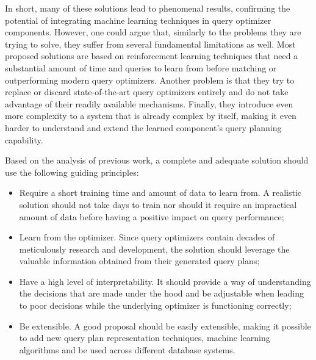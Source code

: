In short, many of these solutions lead to phenomenal results, confirming the potential of integrating machine learning techniques in query optimizer components. However, one could argue that, similarly to the problems they are trying to solve, they suffer from several fundamental limitations as well. Most proposed solutions are based on reinforcement learning techniques that need a substantial amount of time and queries to learn from before matching or outperforming modern query optimizers. Another problem is that they try to replace or discard state-of-the-art query optimizers entirely and do not take advantage of their readily available mechanisms. Finally, they introduce even more complexity to a system that is already complex by itself, making it even harder to understand and extend the learned component's query planning capability.

Based on the analysis of previous work, a complete and adequate solution should use the following guiding principles:

\begin{itemize}
    \item Require a short training time and amount of data to learn from. A realistic solution should not take days to train nor should it require an impractical amount of data before having a positive impact on query performance;

    \item Learn from the optimizer. Since query optimizers contain decades of meticulously research and development, the solution should leverage the valuable information obtained from their generated query plans;
    
    \item Have a high level of interpretability. It should provide a way of understanding the decisions that are made under the hood and be adjustable when leading to poor decisions while the underlying optimizer is functioning correctly;

    \item Be extensible. A good proposal should be easily extensible, making it possible to add new query plan representation techniques, machine learning algorithms and be used across different database systems.
\end{itemize}